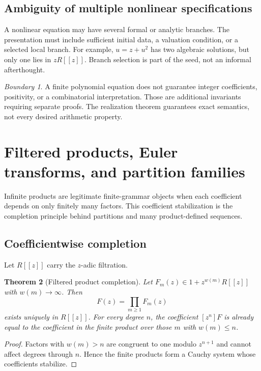 \documentclass[11pt]{article}
\newtheorem{theorem}{Theorem}[section]\newtheorem{proposition}[theorem]{Proposition}\newtheorem{lemma}[theorem]{Lemma}\newtheorem{corollary}[theorem]{Corollary}
\theoremstyle{definition}\newtheorem{definition}[theorem]{Definition}\newtheorem{example}[theorem]{Example}\newtheorem{construction}[theorem]{Construction}\newtheorem{algorithm}[theorem]{Algorithm}\newtheorem{conjecture}[theorem]{Conjecture}\newtheorem{problem}[theorem]{Problem}
\theoremstyle{remark}\newtheorem{remark}[theorem]{Remark}\newtheorem{boundary}[theorem]{Boundary}\newtheorem{certificate}[theorem]{Computational Certificate}\newtheorem{classical}[theorem]{Classical Input}\newtheorem{principle}[theorem]{Structural Principle}
\begin{document}
\subsection{Ambiguity of multiple nonlinear specifications}
A nonlinear equation may have several formal or analytic branches.  The presentation must include sufficient initial data, a valuation condition, or a selected local branch.  For example, $u=z+u^2$ has two algebraic solutions, but only one lies in $zR[[z]]$.  Branch selection is part of the seed, not an informal afterthought.

\begin{boundary}
A finite polynomial equation does not guarantee integer coefficients, positivity, or a combinatorial interpretation.  Those are additional invariants requiring separate proofs.  The realization theorem guarantees exact semantics, not every desired arithmetic property.
\end{boundary}


\section{Filtered products, Euler transforms, and partition families}

Infinite products are legitimate finite-grammar objects when each coefficient depends on only finitely many factors.  This coefficient stabilization is the completion principle behind partitions and many product-defined sequences.

\subsection{Coefficientwise completion}
Let $R[[z]]$ carry the $z$-adic filtration.

\begin{theorem}[Filtered product completion]
Let $F_m(z)\in1+z^{w(m)}R[[z]]$ with $w(m)\to\infty$.  Then
\[
 \boxed{F(z)=\prod_{m\geq1}F_m(z)}
\]
exists uniquely in $R[[z]]$.  For every degree $n$, the coefficient $[z^n]F$ is already equal to the coefficient in the finite product over those $m$ with $w(m)\leq n$.
\end{theorem}
\begin{proof}
Factors with $w(m)>n$ are congruent to one modulo $z^{n+1}$ and cannot affect degrees through $n$.  Hence the finite products form a Cauchy system whose coefficients stabilize.
\end{proof}
\end{document}
